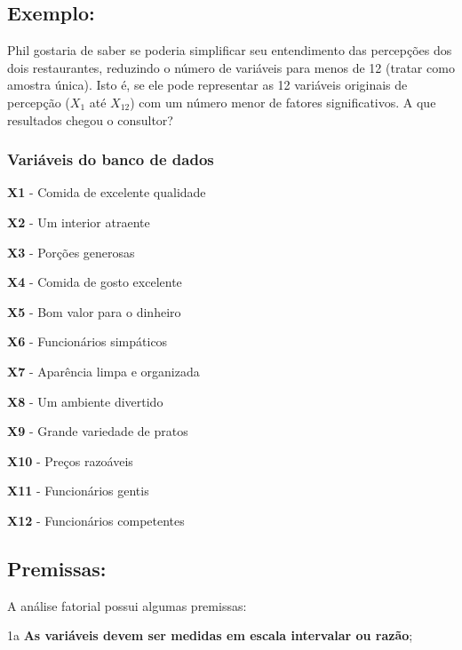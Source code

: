     \subsection{Exemplo:}
    
        Phil gostaria de saber se poderia simplificar seu entendimento das percepções dos dois restaurantes, reduzindo o número de variáveis para menos de 12 (tratar como amostra única). Isto é, se ele pode representar as 12 variáveis originais de percepção ($X_{1}$ até $X_{12}$) com um número menor de fatores significativos. A que resultados chegou o consultor?
        
        \subsubsection{Variáveis do banco de dados}
        
            \textbf{X1} - Comida de excelente qualidade
            
            \textbf{X2} - Um interior atraente
            
            \textbf{X3} - Porções generosas
            
            \textbf{X4} - Comida de gosto excelente
            
            \textbf{X5} - Bom valor para o dinheiro
            
            \textbf{X6} - Funcionários simpáticos
            
            \textbf{X7} - Aparência limpa e organizada
            
            \textbf{X8} - Um ambiente divertido
            
            \textbf{X9} - Grande variedade de pratos
            
            \textbf{X10} - Preços razoáveis
            
            \textbf{X11} - Funcionários gentis
            
            \textbf{X12} - Funcionários competentes
            
    \subsection{Premissas:}
    
        A análise fatorial possui algumas premissas:
        
        1a \textbf{As variáveis devem ser medidas em escala intervalar ou razão};
        
